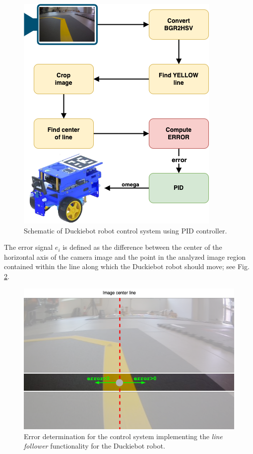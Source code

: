 \documentclass[conference]{IEEEtran}
\begin{document}
\begin{figure}[h]
    \centering
    \includegraphics[width=.8\columnwidth]{PipeLinePID}
    \caption{Schematic of Duckiebot robot control system using PID controller.}
    \label{fig:pid-pipeline}
\end{figure}

The error signal $e_i$ is defined as the difference between the center of the horizontal axis of the camera image and the point in the analyzed image region contained within the line along which the Duckiebot robot should move; see Fig. \ref{fig:error-definition}. 

\begin{figure}[h]
    \centering
    \includegraphics[width=.95\columnwidth]{ErrorDefinition.png}
    \caption{Error determination for the control system implementing the \emph{line follower} functionality for the Duckiebot robot.}
    \label{fig:error-definition}
\end{figure}
\end{document}
